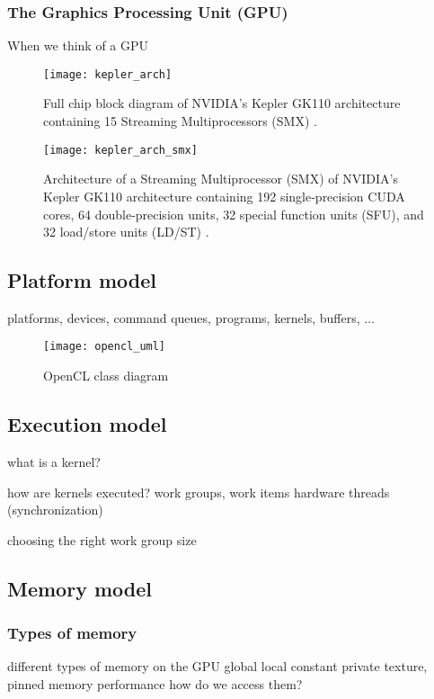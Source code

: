 \subsubsection{The Graphics Processing Unit (GPU)}

When we think of a GPU 

\begin{figure}
\centering
\texttt{[image: kepler\_arch]}
\caption{Full chip block diagram of NVIDIA's Kepler GK110 architecture containing 15 Streaming Multiprocessors (SMX) \cite{kepler_arch}.}
\label{fig:kepler_arch}
\end{figure}

\begin{figure}
\centering
\texttt{[image: kepler\_arch\_smx]}
\caption{Architecture of a Streaming Multiprocessor (SMX) of NVIDIA's Kepler GK110 architecture containing 192 single‐precision CUDA cores, 64 double‐precision units, 32 special function units (SFU), and 32 load/store units (LD/ST) \cite{kepler_arch}.}
\label{fig:kepler_arch_smx}
\end{figure}


\subsection{Platform model}
platforms, devices, command queues, programs, kernels, buffers, ...

\begin{figure} %
\centering
\texttt{[image: opencl\_uml]}
\caption{OpenCL class diagram \cite{opencl_spec}}
\label{fig:opencl_uml}
\end{figure}

\subsection{Execution model}
what is a kernel?

how are kernels executed?
work groups, work items
hardware threads (synchronization)

choosing the right work group size


\subsection{Memory model}

\subsubsection{Types of memory}
different types of memory on the GPU
global local constant private
texture, pinned memory
performance
how do we access them?

